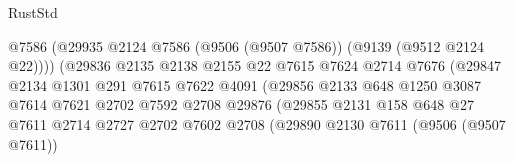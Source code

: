 \begin{lexlean}{RustStd}
\begin{coremodule}
                                            @7586
                                            (@29935
                                              @2124
                                              @7586
                                              (@9506 (@9507 @7586))
                                              (@9139 (@9512 @2124 @22))))
                                          (@29836
                                            @2135
                                            @2138
                                            @2155
                                            @22
                                            @7615
                                            @7624
                                            @2714
                                            @7676
                                            (@29847
                                              @2134
                                              @1301
                                              @291
                                              @7615
                                              @7622
                                              @4091
                                              (@29856
                                                @2133
                                                @648
                                                @1250
                                                @3087
                                                @7614
                                                @7621
                                                @2702
                                                @7592
                                                @2708
                                                @29876
                                                (@29855
                                                  @2131
                                                  @158
                                                  @648
                                                  @27
                                                  @7611
                                                  @2714
                                                  @2727
                                                  @2702
                                                  @7602
                                                  @2708
                                                  (@29890
                                                    @2130
                                                    @7611
                                                    (@9506 (@9507 @7611))

\end{coremodule}
\end{lexlean}
